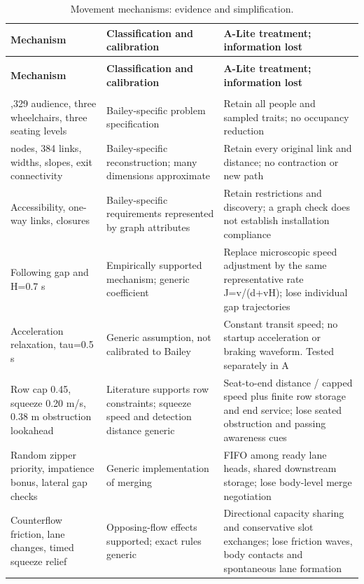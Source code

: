 \documentclass[11pt,a4paper]{article}
\begin{document}
\begingroup\small
\begin{longtable}{@{}>{\raggedright\arraybackslash}p{}>{\raggedright\arraybackslash}p{}>{\raggedright\arraybackslash}p{}@{}}
\caption{Movement mechanisms: evidence and simplification.}\label{tab:1}\\
\toprule
\textbf{Mechanism} & \textbf{Classification and calibration} & \textbf{A-Lite treatment; information lost} \\
\midrule\endfirsthead
\multicolumn{3}{l}{\small\itshape Table \thetable{} continued}\\\toprule
\textbf{Mechanism} & \textbf{Classification and calibration} & \textbf{A-Lite treatment; information lost} \\
\midrule\endhead
\midrule\multicolumn{3}{r}{\small Continued on next page}\\\endfoot
\bottomrule\endlastfoot
1,329 audience, three wheelchairs, three seating levels & Bailey-specific problem specification & Retain all people and sampled traits; no occupancy reduction \\
268 nodes, 384 links, widths, slopes, exit connectivity & Bailey-specific reconstruction; many dimensions approximate & Retain every original link and distance; no contraction or new path \\
Accessibility, one-way links, closures & Bailey-specific requirements represented by graph attributes & Retain restrictions and discovery; a graph check does not establish installation compliance \\
Following gap and H=0.7 s & Empirically supported mechanism; generic coefficient \cite{R4,R19} & Replace microscopic speed adjustment by the same representative rate J=v/(d+vH); lose individual gap trajectories \\
Acceleration relaxation, tau=0.5 s & Generic assumption, not calibrated to Bailey & Constant transit speed; no startup acceleration or braking waveform. Tested separately in A \\
Row cap 0.45, squeeze 0.20 m/s, 0.38 m obstruction lookahead & Literature supports row constraints; squeeze speed and detection distance generic \cite{R18} & Seat-to-end distance / capped speed plus finite row storage and end service; lose seated obstruction and passing awareness cues \\
Random zipper priority, impatience bonus, lateral gap checks & Generic implementation of merging & FIFO among ready lane heads, shared downstream storage; lose body-level merge negotiation \\
Counterflow friction, lane changes, timed squeeze relief & Opposing-flow effects supported; exact rules generic & Directional capacity sharing and conservative slot exchanges; lose friction waves, body contacts and spontaneous lane formation \\
\end{longtable}\endgroup
\end{document}
